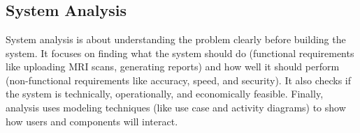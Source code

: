 \section*{\Large{}}
\label{3}

\subsection{System Analysis}
System analysis is about understanding the problem clearly before building the system. It focuses on finding what the system should do (functional requirements like uploading MRI scans, generating reports) and how well it should perform (non-functional requirements like accuracy, speed, and security). It also checks if the system is technically, operationally, and economically feasible. Finally, analysis uses modeling techniques (like use case and activity diagrams) to show how users and components will interact.
